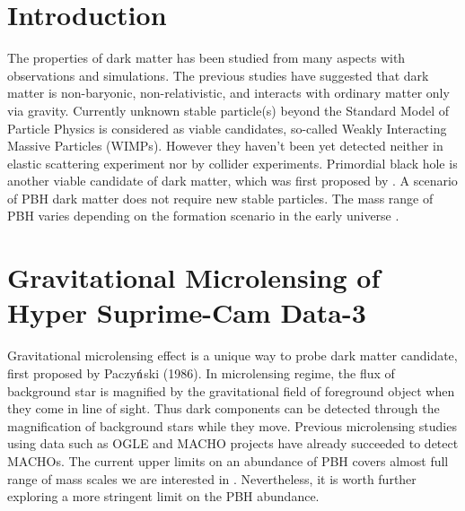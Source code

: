 \documentclass[iop, apj]{emulateapj}
\newcommand{\?}{\stackrel{?}{=}}
\begin{document}
\section{Introduction}
The properties of dark matter has been studied from many aspects with 
observations and simulations. The previous studies have suggested that dark 
matter is non-baryonic, non-relativistic, and interacts with ordinary matter 
only via gravity. Currently unknown stable particle(s) beyond the Standard 
Model of Particle Physics is considered as viable candidates, so-called Weakly 
Interacting Massive Particles (WIMPs). However they haven't been yet detected 
neither in elastic scattering experiment nor by collider experiments. 
Primordial black hole is another viable candidate of dark matter, which was 
first proposed by \citet{Hawking:74}. A scenario of PBH dark matter does not 
require new stable particles. The mass range of PBH varies depending on the 
formation scenario in the early universe \citep{Carretal:10}. 


\section{Gravitational Microlensing of Hyper Suprime-Cam Data-3}

Gravitational microlensing effect is a unique way to probe dark matter candidate, first proposed by Paczy${\rm \acute{n}}$ski (1986). In microlensing regime, the flux of background star is magnified by the gravitational field of foreground object when they come in line of sight. Thus dark components can be detected through the magnification of background stars while they move. 
Previous microlensing studies using data such as OGLE and MACHO projects have already succeeded to detect MACHOs. The current upper limits on an abundance of PBH covers almost full range of mass scales we are interested in \citep{Capelaetal:13b}. Nevertheless, it is worth further exploring a more stringent limit on the PBH abundance. 
\end{document}
